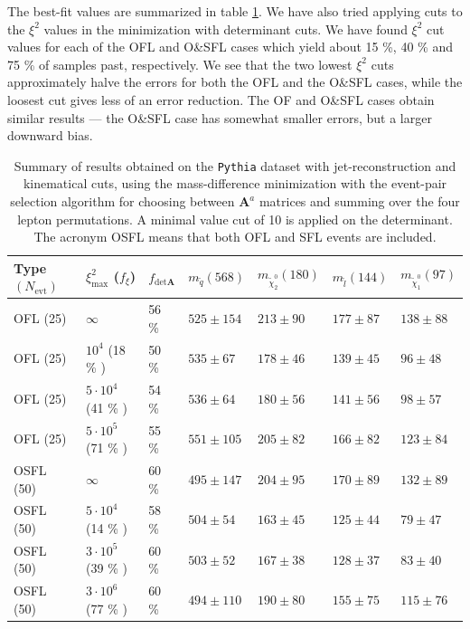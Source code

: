 \documentclass[twoside,english]{uiofysmaster}
\begin{document}
The best-fit values are summarized in table \ref{table:table_jetrec}. We have also tried applying cuts to the $\xi^2$ values in the minimization with determinant cuts. We have found $\xi^2$ cut values for each of the OFL and O\&SFL cases which yield about 15 \%, 40 \% and 75 \% of samples past, respectively. We see that the two lowest $\xi^2$ cuts approximately halve the errors for both the OFL and the O\&SFL cases, while the loosest cut gives less of an error reduction. The OF and O\&SFL cases obtain similar results --- the O\&SFL case has somewhat smaller errors, but a larger downward bias.
\begin{table}[hbt]
	\small
	\centering
	\begin{tabular}{| l | l | l || l | l | l | l |}
		\hline
		Type $(N_\mathrm{evt})$ & $\xi^2_\mathrm{max}$ ($f_\xi$) & $f_{\mathrm{det}\mathbf A}$ & $m_{\tilde q} (568)$ & $m_{\tilde \chi_2^0} (180)$ & $m_{\tilde l} (144)$ & $m_{\tilde \chi_1^0} (97)$ \\
		\hline \hline
		OFL (25) 	& 	$\infty$ 				& 56 \%		&  $525 \pm 154$	&	$213\pm90$	&	$177\pm87$	& 	$138\pm88$	\\
		OFL (25) 	& 	$10^4$ (18 \% ) 		& 50 \% 	& $535\pm67$	&	$178\pm46$	&	$139\pm45$	& 	$96\pm48$	\\
		OFL (25) 	& 	$5\cdot10^4$ (41 \% ) 	& 54 \%		& $536\pm64$	&	$180\pm56$	&	$141\pm56$	& 	$98\pm57$	\\
		OFL (25) 	& 	$5\cdot10^5$ (71 \% ) 	& 55 \%		& $551\pm105$	&	$205\pm82$	&	$166\pm82$	& 	$123\pm84$	\\
		OSFL (50) 	& 	$\infty$ 				& 60 \%		& $495\pm147$	&	$204\pm95$	&	$170\pm89$	& 	$132\pm89$	\\
		OSFL (50) 	& 	$5\cdot10^4$ (14 \% ) 	& 58 \%		& $504\pm54$	&	$163\pm45$	&	$125\pm44$	& 	$79\pm47$	\\
		OSFL (50) 	& 	$3\cdot10^5$ (39 \% ) 	& 60 \%		& $503\pm52$	&	$167\pm38$	&	$128\pm37$	& 	$83\pm40$	\\
		OSFL (50) 	& 	$3\cdot10^6$ (77 \% ) 	& 60 \%		& $494\pm110$	&	$190\pm80$	&	$155\pm75$	& 	$115\pm76$	\\
		\hline
	\end{tabular}
	\caption{Summary of results obtained on the {\tt Pythia} dataset with jet-reconstruction and kinematical cuts, using the mass-difference minimization with the event-pair selection algorithm for choosing between $\mathbf A^a$ matrices and summing over the four lepton permutations. A minimal value cut of 10 is applied on the determinant. The acronym OSFL means that both OFL and SFL events are included.}
	\label{table:table_jetrec}
\end{table}
\end{document}
